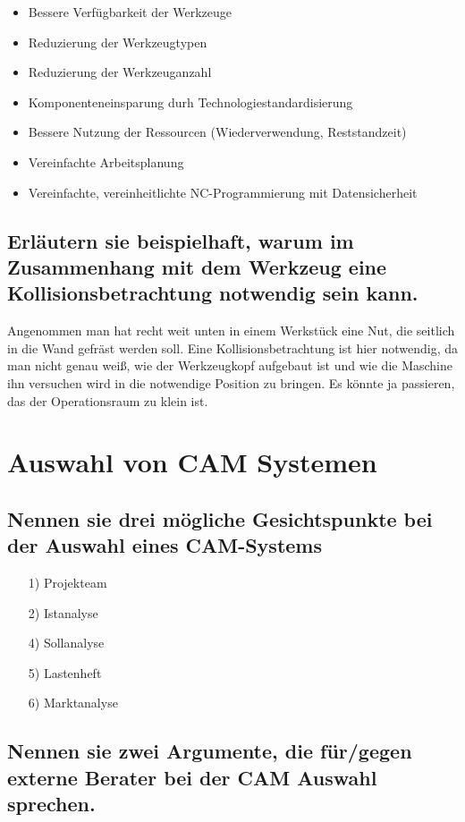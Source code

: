 \begin{itemize}
    \item Bessere Verfügbarkeit der Werkzeuge
    \item Reduzierung der Werkzeugtypen
    \item Reduzierung der Werkzeuganzahl
    \item Komponenteneinsparung durh Technologiestandardisierung
    \item Bessere Nutzung der Ressourcen (Wiederverwendung, Reststandzeit)
    \item Vereinfachte Arbeitsplanung
    \item Vereinfachte, vereinheitlichte NC-Programmierung mit Datensicherheit
\end{itemize}

\subsection*{%
    Erläutern sie beispielhaft, warum im Zusammenhang mit dem Werkzeug eine
    Kollisionsbetrachtung notwendig sein kann.
}

Angenommen man hat recht weit unten in einem Werkstück eine Nut, die seitlich
in die Wand gefräst werden soll. Eine Kollisionsbetrachtung ist hier notwendig,
da man nicht genau weiß, wie der Werkzeugkopf aufgebaut ist und wie die
Maschine ihn versuchen wird in die notwendige Position zu bringen. Es könnte ja
passieren, das der Operationsraum zu klein ist.


\newpage


\section{Auswahl von CAM Systemen}


\subsection*{
Nennen sie drei mögliche Gesichtspunkte bei der Auswahl eines CAM-Systems
}


\begin{itemize}
\item[1)] Projekteam
\item[2)] Istanalyse
\item[4)] Sollanalyse
\item[5)] Lastenheft
\item[6)] Marktanalyse
\end{itemize}


\subsection*{
Nennen sie zwei Argumente, die für/gegen externe Berater bei der CAM Auswahl sprechen.
}


